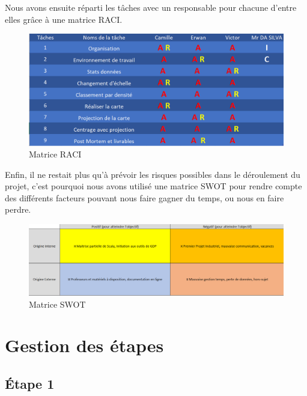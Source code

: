 \documentclass{article}
\begin{document}
Nous avons ensuite réparti les tâches avec un responsable pour chacune d’entre elles grâce à une matrice RACI.

\vspace{1\baselineskip}

\begin{figure}[H]
    \centering
    \includegraphics[scale=0.4]{raci.png}
    \caption{Matrice RACI}
    \label{fig:raci}
\end{figure}

\newpage
Enfin, il ne restait plus qu’à prévoir les risques possibles dans le déroulement du projet, c’est pourquoi nous avons utilisé une matrice SWOT pour rendre compte des différents facteurs pouvant nous faire gagner du temps, ou nous en faire perdre.


\begin{figure}[H]
    \centering
    \includegraphics[scale=0.5]{swot.png}
    \caption{Matrice SWOT}
    \label{fig:swot}
\end{figure}

\vspace{3\baselineskip}

\section{ Gestion des étapes}


\subsection{ Étape 1} 
\end{document}
